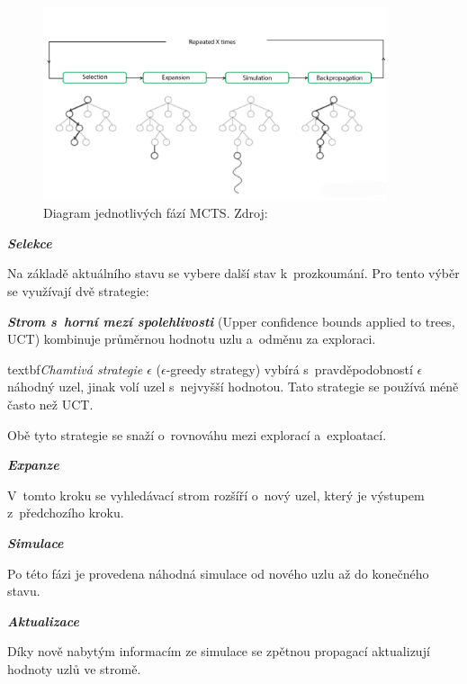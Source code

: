 \begin{figure}[H]
	\centering
	\includegraphics[width=0.9\textwidth]{obrazky-figures/mcts}
	\caption{Diagram jednotlivých fází MCTS.\@
  Zdroj:~\cite{mcts_geeksforgeeks}}\label{fig:mcts}
\end{figure}
\pagebreak
\begin{myitemize}
  \item \textbf{\emph{Selekce}}

  Na základě aktuálního stavu se vybere další stav k~prozkoumání.
  Pro tento výběr se využívají dvě strategie:
  
  \textbf{\emph{Strom s~horní mezí spolehlivosti}} (Upper confidence bounds applied to trees, UCT) kombinuje průměrnou hodnotu uzlu a~odměnu za exploraci.

  \label{epsilon_greedy}
  textbf{\emph{Chamtivá strategie $\epsilon$ }} ($\epsilon$-greedy strategy) vybírá s~pravděpodobností $\epsilon$ náhodný uzel, jinak volí uzel s~nejvyšší hodnotou.
  Tato strategie se používá méně často než UCT\@.

  Obě tyto strategie se snaží o~rovnováhu mezi explorací a~exploatací.
  \item \textbf{\emph{Expanze}}

  V~tomto kroku se vyhledávací strom rozšíří o~nový uzel, který je výstupem z~předchozího kroku.

  \item \textbf{\emph{Simulace}}

  Po této fázi je provedena náhodná simulace od nového uzlu až do konečného stavu.

  \item \textbf{\emph{Aktualizace}}
  
  Díky nově nabytým informacím ze simulace se zpětnou propagací aktualizují hodnoty uzlů ve stromě.
\end{myitemize}


